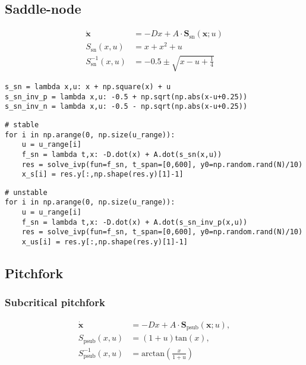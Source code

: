 \hypertarget{saddle-node}{%
\subsection{Saddle-node}\label{saddle-node}}

\begin{equation}
\begin{aligned}
    \dot{\mathbf{x}} &= -Dx + A\cdot \mathbf{S}_\text{sn}(\mathbf{x};u)\\
    S_\text{sn}(x,u) &= x + x^2 + u\\
    S_\text{sn}^{-1}(x,u) &= -0.5 \pm \sqrt{x-u+\frac{1}{4}}
\end{aligned}
\end{equation}

\begin{verbatim}
s_sn = lambda x,u: x + np.square(x) + u
s_sn_inv_p = lambda x,u: -0.5 + np.sqrt(np.abs(x-u+0.25))
s_sn_inv_n = lambda x,u: -0.5 - np.sqrt(np.abs(x-u+0.25))
\end{verbatim}

\begin{verbatim}
# stable
for i in np.arange(0, np.size(u_range)):
    u = u_range[i]
    f_sn = lambda t,x: -D.dot(x) + A.dot(s_sn(x,u))
    res = solve_ivp(fun=f_sn, t_span=[0,600], y0=np.random.rand(N)/10)
    x_s[i] = res.y[:,np.shape(res.y)[1]-1]
\end{verbatim}

\begin{verbatim}
# unstable
for i in np.arange(0, np.size(u_range)):
    u = u_range[i]
    f_sn = lambda t,x: -D.dot(x) + A.dot(s_sn_inv_p(x,u))
    res = solve_ivp(fun=f_sn, t_span=[0,600], y0=np.random.rand(N)/10)
    x_us[i] = res.y[:,np.shape(res.y)[1]-1]
\end{verbatim}

\hypertarget{pitchfork}{%
\subsection{Pitchfork}\label{pitchfork}}

\hypertarget{subcritical-pitchfork}{%
\subsubsection{Subcritical pitchfork}\label{subcritical-pitchfork}}

\begin{equation}
\begin{aligned}
\dot{\mathbf{x}} &= -Dx + A\cdot \mathbf{S}_\mathrm{psub}(\mathbf{x};u),\\
S_\mathrm{psub}(x,u) &= (1+u)\mathrm{tan}(x),\\
S_\mathrm{psub}^{-1}(x,u) &= \mathrm{arctan}(\frac{x}{1+u})
\end{aligned}
\end{equation}

